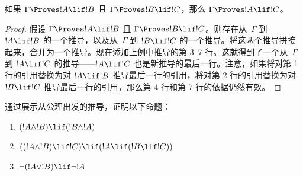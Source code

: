 \documentclass[../../../include/open-logic-section]{subfiles}
\begin{document}
\begin{prop}
   如果 $\Gamma \Proves !A \lif !B$ 且 $\Gamma
  \Proves !B \lif !C$，那么 $\Gamma \Proves !A \lif !C$。
\end{prop}

\begin{proof}
  假设 $\Gamma \Proves !A \lif !B$ 且 $\Gamma \Proves !B \lif
  !C$。则存在从~$\Gamma$ 到 $!A \lif !B$ 的一个推导，以及从~$\Gamma$ 到 $!B \lif !C$ 的一个推导。将这两个推导拼接起来，合并为一个推导。现在添加上例中推导的第 3--7 行。这就得到了一个从~$\Gamma$ 到 $!A \lif !C$ 的推导——$!A \lif !C$ 也是新推导的最后一行。注意，如果将对第 1 行的引用替换为对 $!A \lif !B$ 推导最后一行的引用，将对第 2 行的引用替换为对 $!B \lif !C$ 推导最后一行的引用，那么第 4 行和第 7 行的依据仍然有效。
\end{proof}

\begin{prob}
通过展示从公理出发的推导，证明以下命题：
\begin{enumerate}
\item $(!A \land !B) \lif (!B \land !A)$
\item $((!A \land !B) \lif !C) \lif (!A \lif (!B \lif !C))$
\item $\lnot(!A \lor !B) \lif \lnot !A$
\end{enumerate}
\end{prob}
\end{document}
